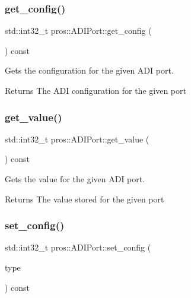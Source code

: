 \subsubsection{\texorpdfstring{get\+\_\+config()}{get\_config()}}
{\footnotesize\ttfamily std\+::int32\+\_\+t pros\+::\+A\+D\+I\+Port\+::get\+\_\+config (\begin{DoxyParamCaption}\item[{void}]{ }\end{DoxyParamCaption}) const}



Gets the configuration for the given A\+DI port. 

\begin{DoxyReturn}{Returns}
The A\+DI configuration for the given port 
\end{DoxyReturn}
\mbox{\label{classpros_1_1ADIPort_ac79b5fd3ce67ae6ffc4b1fbbb306e997}} 
\subsubsection{\texorpdfstring{get\+\_\+value()}{get\_value()}}
{\footnotesize\ttfamily std\+::int32\+\_\+t pros\+::\+A\+D\+I\+Port\+::get\+\_\+value (\begin{DoxyParamCaption}\item[{void}]{ }\end{DoxyParamCaption}) const}



Gets the value for the given A\+DI port. 

\begin{DoxyReturn}{Returns}
The value stored for the given port 
\end{DoxyReturn}
\mbox{\label{classpros_1_1ADIPort_abd86653eebbc34b863ace81839f7e40c}} 
\subsubsection{\texorpdfstring{set\+\_\+config()}{set\_config()}}
{\footnotesize\ttfamily std\+::int32\+\_\+t pros\+::\+A\+D\+I\+Port\+::set\+\_\+config (\begin{DoxyParamCaption}\item[{\hyperlink{adi_8h_a4efff81399e823764aa05cd5c172ea55}{adi\+\_\+port\+\_\+config\+\_\+e\+\_\+t}}]{type }\end{DoxyParamCaption}) const}




